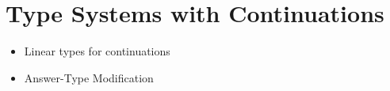\section{Type Systems with Continuations}

\begin{frame}
	\frametitlesec

	\begin{itemize}
		\item Linear types for continuations
		\item Answer-Type Modification
	\end{itemize}
\end{frame}
